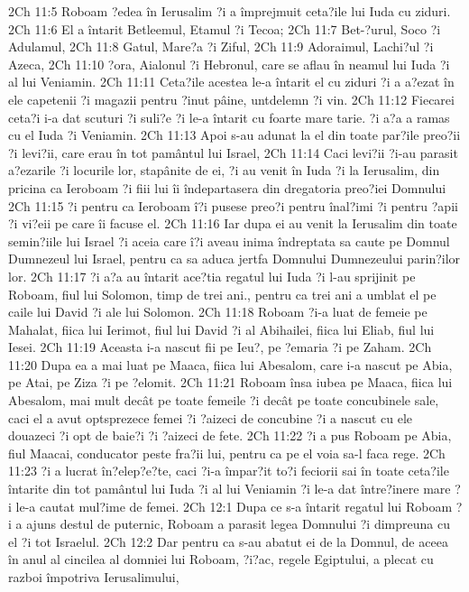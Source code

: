 2Ch 11:5  Roboam ?edea în Ierusalim ?i a împrejmuit ceta?ile lui Iuda cu ziduri.
2Ch 11:6  El a întarit Betleemul, Etamul ?i Tecoa;
2Ch 11:7  Bet-?urul, Soco ?i Adulamul,
2Ch 11:8  Gatul, Mare?a ?i Ziful,
2Ch 11:9  Adoraimul, Lachi?ul ?i Azeca,
2Ch 11:10  ?ora, Aialonul ?i Hebronul, care se aflau în neamul lui Iuda ?i al lui Veniamin.
2Ch 11:11  Ceta?ile acestea le-a întarit el cu ziduri ?i a a?ezat în ele capetenii ?i magazii pentru ?inut pâine, untdelemn ?i vin.
2Ch 11:12  Fiecarei ceta?i i-a dat scuturi ?i suli?e ?i le-a întarit cu foarte mare tarie. ?i a?a a ramas cu el Iuda ?i Veniamin.
2Ch 11:13  Apoi s-au adunat la el din toate par?ile preo?ii ?i levi?ii, care erau în tot pamântul lui Israel,
2Ch 11:14  Caci levi?ii ?i-au parasit a?ezarile ?i locurile lor, stapânite de ei, ?i au venit în Iuda ?i la Ierusalim, din pricina ca Ieroboam ?i fiii lui îi îndepartasera din dregatoria preo?iei Domnului
2Ch 11:15  ?i pentru ca Ieroboam î?i pusese preo?i pentru înal?imi ?i pentru ?apii ?i vi?eii pe care îi facuse el.
2Ch 11:16  Iar dupa ei au venit la Ierusalim din toate semin?iile lui Israel ?i aceia care î?i aveau inima îndreptata sa caute pe Domnul Dumnezeul lui Israel, pentru ca sa aduca jertfa Domnului Dumnezeului parin?ilor lor.
2Ch 11:17  ?i a?a au întarit ace?tia regatul lui Iuda ?i l-au sprijinit pe Roboam, fiul lui Solomon, timp de trei ani., pentru ca trei ani a umblat el pe caile lui David ?i ale lui Solomon.
2Ch 11:18  Roboam ?i-a luat de femeie pe Mahalat, fiica lui Ierimot, fiul lui David ?i al Abihailei, fiica lui Eliab, fiul lui Iesei.
2Ch 11:19  Aceasta i-a nascut fii pe Ieu?, pe ?emaria ?i pe Zaham.
2Ch 11:20  Dupa ea a mai luat pe Maaca, fiica lui Abesalom, care i-a nascut pe Abia, pe Atai, pe Ziza ?i pe ?elomit.
2Ch 11:21  Roboam însa iubea pe Maaca, fiica lui Abesalom, mai mult decât pe toate femeile ?i decât pe toate concubinele sale, caci el a avut optsprezece femei ?i ?aizeci de concubine ?i a nascut cu ele douazeci ?i opt de baie?i ?i ?aizeci de fete.
2Ch 11:22  ?i a pus Roboam pe Abia, fiul Maacai, conducator peste fra?ii lui, pentru ca pe el voia sa-l faca rege.
2Ch 11:23  ?i a lucrat în?elep?e?te, caci ?i-a împar?it to?i feciorii sai în toate ceta?ile întarite din tot pamântul lui Iuda ?i al lui Veniamin ?i le-a dat între?inere mare ?i le-a cautat mul?ime de femei.
2Ch 12:1  Dupa ce s-a întarit regatul lui Roboam ?i a ajuns destul de puternic, Roboam a parasit legea Domnului ?i dimpreuna cu el ?i tot Israelul.
2Ch 12:2  Dar pentru ca s-au abatut ei de la Domnul, de aceea în anul al cincilea al domniei lui Roboam, ?i?ac, regele Egiptului, a plecat cu razboi împotriva Ierusalimului,
